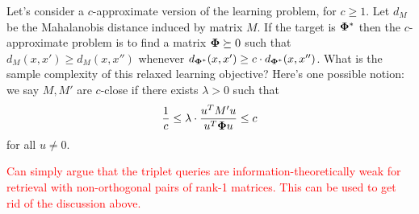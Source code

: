 Let's consider a $c$-approximate version of the learning problem, for $c \geq 1$. Let $d_M$ be the Mahalanobis distance induced by matrix $M$. If the target is $\pphi^*$ then the $c$-approximate problem is to find a matrix $\boldsymbol{\Phi} \succeq 0$ such that $d_M(x,x') \geq d_M(x,x'')$ whenever $d_{\boldsymbol{\Phi}^*}(x,x') \geq c \cdot d_{\boldsymbol{\Phi}^*}(x,x'')$. What is the sample complexity of this relaxed learning objective? Here's one possible notion: we say $M, M'$ are $c$-close if there exists $\lambda > 0$ such that
$$ \frac{1}{c} \leq \lambda \cdot \frac{u^T M' u}{u^T \boldsymbol{\Phi} u} \leq c$$
for all $u \neq 0$.

\textcolor{red}{Can simply argue that the triplet queries are information-theoretically weak for retrieval with non-orthogonal pairs of rank-1 matrices. This can be used to get rid of the discussion above.}
\fi


\iffalse
\begin{figure*}[t] %
    \centering %
    \begin{subfigure}[b]{0.3\textwidth} %
        \centering %
        \texttt{[image: ICML'25/Images/ground\_mono.png]} %
        \caption{Matrix $\pphi^*$ trained with RFM} %
        \label{fig:sub1} %
    \end{subfigure}
    \qquad
    \begin{subfigure}[b]{0.3\textwidth}
        \centering
        \texttt{[image: ICML'25/Images/feedback\_mono.png]}
        \caption{Approximation with feedback}
        \label{fig:sub2}
    \end{subfigure}
    \caption{ In this setting, we consider monomial regression where we sample random vectors of dimension 10 $z \sim \cN(0, .5 \mathbb{I}_{10})$} of dimension 10 and compute a target function $f^*(z) = z_0z_1\mathbf{1}(z_5 > 0)$. We train a kernel machine using RF\pphi (recursive feature machine), of the form $\hat{f}_M(z) = \sum_{y_i \in \cD_{\sf{train}}} a_i \cdot K_M(y_i,z)$, for 5 iterations on 5000 sampled training points and obtain a feature matrix in (a) above. Each iteration of update for $M$ is based on gradient computation of the form $\pphi = \sum_{z \in \cD_{\sf{train}}} (\frac{\partial \hat{f}_{M}}{\partial z })(\frac{\partial \hat{f}_{M}}{\partial z})^\top$. 
    On the right-hand side in (b), the agent provides (at most) 10 constructive feedbacks (rank of $\pphi^*$ is 4) to teach $\pphi^*$. We visualize the oblivious solution learned as $\hat{M}$. MSE on 4000 test samples: with the ground truth matrix-\textbf{0.0022}, and with the feature matrix with feedback-\textbf{0.00219}.
    
    \label{fig:main} %
\end{figure*}
\fi 
\iffalse
